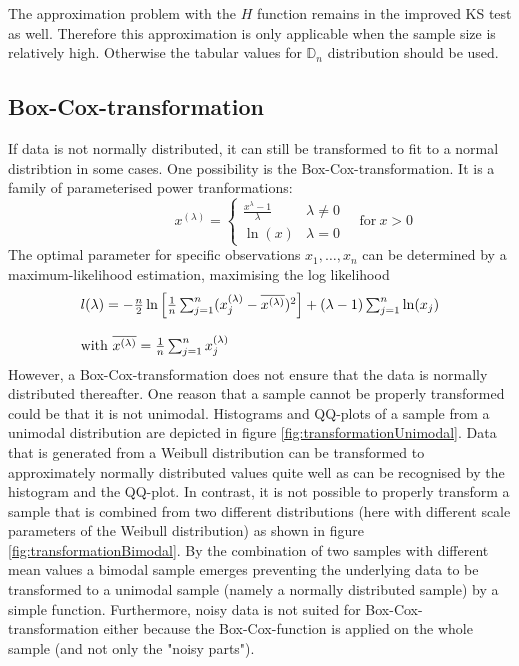 \documentclass[a4paper, 12pt, titlepage, headsepline, listof = totoc, bibliography = totoc, numbers = noenddot]{scrartcl}
\begin{document}
The approximation problem with the $H$ function remains in the improved KS test
as well. Therefore this approximation is only applicable when 
the sample size is relatively high. Otherwise the tabular values for
$\mathbb{D}_n$ distribution should be used. 



\subsection{Box-Cox-transformation}\label{sec:boxcox-theory}

If data is not normally distributed, it can still be transformed to fit to a normal distribtion in some cases. One possibility is the Box-Cox-transformation. It is a family of parameterised power tranformations:
\[
  \phantom{\quad\mbox{for}\ x > 0}
   x^{(\lambda)} =
   \left\{ 
    \begin{array}{cl}
                 \frac{x^\lambda - 1}{\lambda} & \lambda \neq 0\\
                 \ln(x) & \lambda = 0
    \end{array}
   \right.
   \quad\mbox{for}\ x > 0
\]
The optimal parameter for specific observations $x_1, \dots, x_n$ can be determined by a maximum-likelihood estimation, maximising the log likelihood
\[
\begin{array}{l}
\vspace{12pt}
   l(\lambda) = - \frac{n}{2}\ln\left[\frac{1}{n}\sum_{j=1}^{n}(x_j^{(\lambda)} - \overline{x^{(\lambda)}})^2\right] + (\lambda - 1) \sum_{j=1}^{n}\ln(x_j)\\
   \mbox{with}\ \overline{x^{(\lambda)}} = \frac{1}{n} \sum_{j=1}^{n}x_j^{(\lambda)}
\end{array}
\]
However, a Box-Cox-transformation does not ensure that the data is normally distributed thereafter. One reason that a sample cannot be properly transformed could be that it is not unimodal. Histograms and QQ-plots of a sample from a unimodal distribution are depicted in figure \ref{fig:transformationUnimodal}. Data that is generated from a Weibull distribution can be transformed to approximately normally distributed values quite well as can be recognised by the histogram and the QQ-plot. In contrast, it is not possible to properly transform a sample that is combined from two different distributions (here with different scale parameters of the Weibull distribution) as shown in figure \ref{fig:transformationBimodal}. By the combination of two samples with different mean values a bimodal sample emerges preventing the underlying data to be transformed to a unimodal sample (namely a normally distributed sample) by a simple function. Furthermore, noisy data is not suited for Box-Cox-transformation either because the Box-Cox-function is applied on the whole sample (and not only the "noisy parts").
\newpage
\phantom{.}
\vfill
\end{document}
